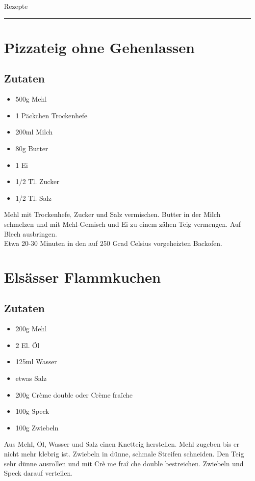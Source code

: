 \documentclass{article}
\begin{document}
{\Huge Rezepte}
\vspace{1cm}
\hrule
\vspace{1cm}
\tableofcontents
\newpage

\section{Pizzateig ohne Gehenlassen}
	\subsection*{Zutaten}
	\begin{itemize}
	  \item 500g Mehl
	  \item 1 Päckchen Trockenhefe
	  \item 200ml Milch
	  \item 80g Butter
	  \item 1 Ei
	  \item 1/2 Tl. Zucker
	  \item 1/2 Tl. Salz
	\end{itemize}
	Mehl mit Trockenhefe, Zucker und Salz vermischen.
	Butter in der Milch schmelzen und mit Mehl-Gemisch und Ei zu einem zähen Teig
	vermengen. Auf Blech ausbringen.\\
	Etwa 20-30 Minuten in den auf 250 Grad Celsius vorgeheizten Backofen.

\section{Elsässer Flammkuchen}
	\subsection*{Zutaten}
	\begin{itemize}
	  \item 200g Mehl
	  \item 2 El. Öl
	  \item 125ml Wasser
	  \item etwas Salz
	  \item 200g Cr\`{e}me double oder Cr\`{e}me fra\^{i}che
	  \item 100g Speck
	  \item 100g Zwiebeln
	\end{itemize}
	Aus Mehl, Öl, Wasser und Salz einen Knetteig herstellen.
	Mehl zugeben bis er nicht mehr klebrig ist.
	Zwiebeln in dünne, schmale Streifen schneiden.
	Den Teig sehr dünne ausrollen und mit Cr\`{e} me fra\^{i} che double
	bestreichen.
	Zwiebeln und Speck darauf verteilen.
\end{document}
